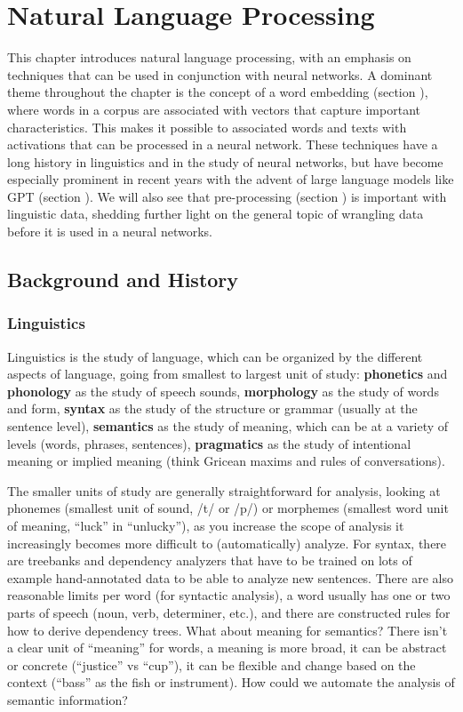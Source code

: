 \chapter{Natural Language Processing}\label{ch_nlp}

This chapter introduces natural language processing, with an emphasis on techniques that can be used in conjunction with neural networks. A dominant theme throughout the chapter is the concept of a word embedding (section ), where words in a corpus are associated with vectors that capture important characteristics. This makes it possible to associated words and texts with activations that can be processed in a neural network. These techniques have a long history in linguistics and in the study of neural networks, but have become especially prominent in recent years with the advent of large language models like GPT (section ). We will also see that pre-processing (section ) is important with linguistic data, shedding further light on the general topic of wrangling data before it is used in a neural networks.

\section{Background and History}

\subsection{Linguistics}

Linguistics is the study of language, which can be organized by the different aspects of language, going from smallest to largest unit of study: \textbf{phonetics} and \textbf{phonology} as the study of speech sounds, \textbf{morphology} as the study of words and form, \textbf{syntax} as the study of the structure or grammar (usually at the sentence level), \textbf{semantics} as the study of meaning, which can be at a variety of levels (words, phrases, sentences), \textbf{pragmatics} as the study of intentional meaning or implied meaning (think Gricean maxims and rules of conversations). 

The smaller units of study are generally straightforward for analysis, looking at phonemes (smallest unit of sound, /t/ or /p/) or morphemes (smallest word unit of meaning, ``luck'' in ``unlucky''), as you increase the scope of analysis it increasingly becomes more difficult to (automatically) analyze. For syntax, there are treebanks and dependency analyzers that have to be trained on lots of example hand-annotated data to be able to analyze new sentences. There are also reasonable limits per word (for syntactic analysis), a word usually has one or two parts of speech (noun, verb, determiner, etc.), and there are constructed rules for how to derive dependency trees. What about meaning for semantics? There isn't a clear unit of ``meaning'' for words, a meaning is more broad, it can be abstract or concrete (``justice'' vs ``cup''), it can be flexible and change based on the context (``bass'' as the fish or instrument). How could we automate the analysis of semantic information?

